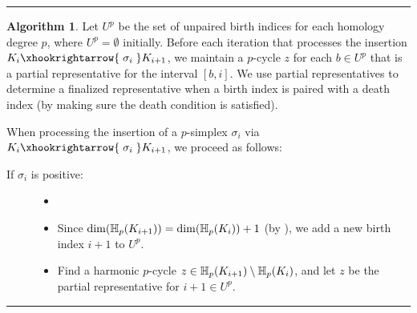 \documentclass[10pt,a4paper]{amsart}
\newcommand {\mm}[1] {\ifmmode{#1}\else{\mbox{\(#1\)}}\fi}
\newcommand{\har}           {\mm{\mathbb{H}}}
\theoremstyle{definition}
\newtheorem{algr}[algorithm]{Algorithm}
\newcommand{\fsimp}{\sigma}
\newcommand{\lbarrowspace}{\;}
\newcommand{\inctosp}[1]{\xhookrightarrow{\lbarrowspace#1\lbarrowspace}}
\newcommand{\sG}{\sigma}
\theoremstyle{remark}
\begin{document}
\makeatletter
  \def\vhrulefill#1{\leavevmode\leaders\hrule\@height#1\hfill \kern\z@}
\makeatother

\newenvironment{algrl}
    {\vspace{5pt}
\par\nobreak\nobreak\noindent\vhrulefill{0.8pt}
\begin{algr}
\vspace{-5pt}
    }
    { 
\vspace{-3pt}    
\par\nobreak\nobreak\noindent\vhrulefill{0.8pt}
\end{algr}
\vspace{3pt}
    }

\begin{algrl}\label{alg:frame}
Let $U^p$ be the set of unpaired birth indices for each homology degree $p$, where $U^p=\emptyset$ initially. Before each iteration that processes the insertion $K_{i}\inctosp{\fsimp_i}K_{i+1}$, we maintain a $p$-cycle $z$ for each $b\in U^p$ that is a partial representative for the interval $[b,i]$.
We use partial representatives to determine a finalized representative when a birth index is paired with a death index (by making sure the death condition is satisfied).

When processing the insertion of a $p$-simplex $\fsimp_i$ via $K_{i}\inctosp{\fsimp_i}K_{i+1}$, we proceed as follows:
\begin{description}
    \item[If $\sG_i$ is positive:] 
    \begin{itemize}
        \item[]
        \item Since $\dim(\har_p(K_{i+1}))=\dim(\har_p(K_{i}))+1$ (by ), we add a new birth index $i+1$ to $U^{p}$.
        \item Find a harmonic $p$-cycle $z\in\har_p(K_{i+1})\setminus\har_p(K_{i})$, and let $z$ be the partial representative for $i+1\in U^p$.
    \end{itemize}
    

\end{description}
\end{algrl}
\end{document}
